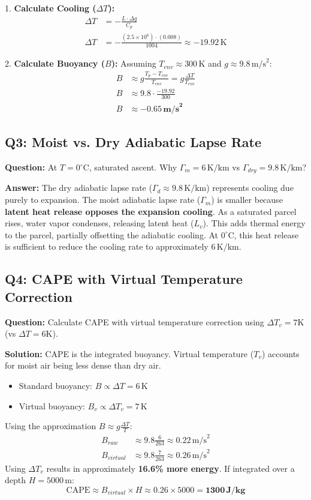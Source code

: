 \documentclass[11pt,a4paper]{article}
\begin{document}
1. \textbf{Calculate Cooling ($\Delta T$):}
\begin{align*}
    \Delta T &= -\frac{L \cdot \Delta q}{C_p} \\
    \Delta T &= -\frac{(2.5 \times 10^6) \cdot (0.008)}{1004} \approx -19.92\,\text{K}
\end{align*}

2. \textbf{Calculate Buoyancy ($B$):}
Assuming $T_{env} \approx 300\,\text{K}$ and $g \approx 9.8\,\text{m/s}^2$:
\begin{align*}
    B &\approx g \frac{T_p - T_{env}}{T_{env}} = g \frac{\Delta T}{T_{env}} \\
    B &\approx 9.8 \cdot \frac{-19.92}{300} \\
    B &\approx \mathbf{-0.65\,\text{m/s}^2}
\end{align*}

\subsection*{Q3: Moist vs. Dry Adiabatic Lapse Rate}
\textbf{Question:} At $T=0^{\circ}\text{C}$, saturated ascent. Why $\Gamma_m=6\,\text{K/km}$ vs $\Gamma_{dry}=9.8\,\text{K/km}$?

\textbf{Answer:}
The dry adiabatic lapse rate ($\Gamma_d \approx 9.8\,\text{K/km}$) represents cooling due purely to expansion. The moist adiabatic lapse rate ($\Gamma_m$) is smaller because \textbf{latent heat release opposes the expansion cooling}.
As a saturated parcel rises, water vapor condenses, releasing latent heat ($L_v$). This adds thermal energy to the parcel, partially offsetting the adiabatic cooling. At $0^\circ\text{C}$, this heat release is sufficient to reduce the cooling rate to approximately $6\,\text{K/km}$.

\subsection*{Q4: CAPE with Virtual Temperature Correction}
\textbf{Question:} Calculate CAPE with virtual temperature correction using $\Delta T_v=7\text{K}$ (vs $\Delta T=6\text{K}$).

\textbf{Solution:}
CAPE is the integrated buoyancy. Virtual temperature ($T_v$) accounts for moist air being less dense than dry air.
\begin{itemize}
    \item Standard buoyancy: $B \propto \Delta T = 6\,\text{K}$
    \item Virtual buoyancy: $B_v \propto \Delta T_v = 7\,\text{K}$
\end{itemize}
Using the approximation $B \approx g \frac{\Delta T}{T}$:
\begin{align*}
    B_{raw} &\approx 9.8 \frac{6}{263} \approx 0.22\,\text{m/s}^2 \\
    B_{virtual} &\approx 9.8 \frac{7}{263} \approx 0.26\,\text{m/s}^2
\end{align*}
Using $\Delta T_v$ results in approximately \textbf{16.6\% more energy}. If integrated over a depth $H=5000\,\text{m}$:
\[ \text{CAPE} \approx B_{virtual} \times H \approx 0.26 \times 5000 = \mathbf{1300\,\text{J/kg}} \]
\end{document}
